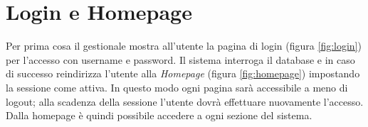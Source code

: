 \section{Login e Homepage}
Per prima cosa il gestionale mostra all'utente la pagina di login (figura \ref{fig:login}) per l'accesso con username e password. Il sistema interroga il database e in caso di successo reindirizza l'utente alla \textit{Homepage} (figura \ref{fig:homepage}) impostando la sessione come attiva. In questo modo ogni pagina sarà accessibile a meno di logout; alla scadenza della sessione l'utente dovrà effettuare nuovamente l'accesso. Dalla homepage è quindi possibile accedere a ogni sezione del sistema.
\begin{figure}[!hbt]
\centering
\begin{minipage}[b]{0.3\textwidth}

\end{minipage}
\end{figure}

